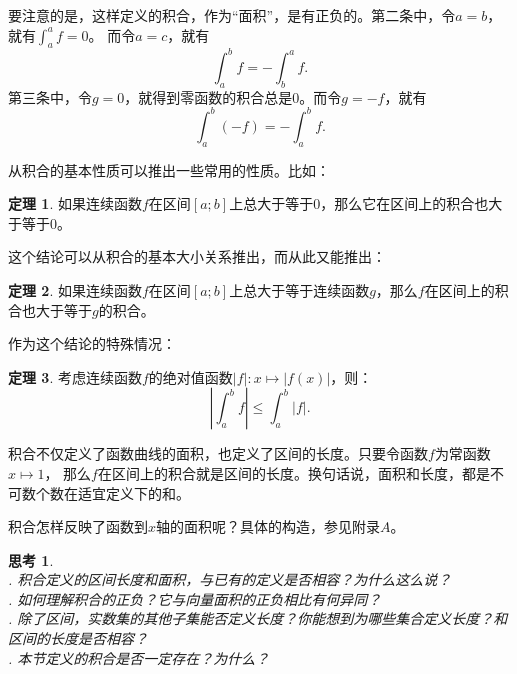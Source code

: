\documentclass[12pt,UTF8]{ctexbook}
\theoremstyle{definition}
\newtheorem{tm}{定理}[section]
\theoremstyle{plain}
\newtheorem{sk}{思考}[section]
\begin{document}
要注意的是，这样定义的积合，作为“面积”，是有正负的。第二条中，令$a=b$，就有$\int_a^a f = 0$。
而令$a = c$，就有
$$\int_a^b f = - \int_b^a f.$$
第三条中，令$g=0$，就得到零函数的积合总是$0$。而令$g = -f$，就有
$$\int_a^b (-f) = -\int_a^b f. $$

从积合的基本性质可以推出一些常用的性质。比如：

\begin{tm}
    如果连续函数$f$在区间$[a; b]$上总大于等于$0$，那么它在区间上的积合也大于等于$0$。
\end{tm}

这个结论可以从积合的基本大小关系推出，而从此又能推出：

\begin{tm}
    如果连续函数$f$在区间$[a; b]$上总大于等于连续函数$g$，那么$f$在区间上的积合也大于等于$g$的积合。
\end{tm}

作为这个结论的特殊情况：

\begin{tm}
    考虑连续函数$f$的绝对值函数$|f|: x\mapsto |f(x)|$，则：
    $$ \left| \int_a^b f \right| \leqslant \int_a^b |f|. $$

\end{tm}

积合不仅定义了函数曲线的面积，也定义了区间的长度。只要令函数$f$为常函数$x\mapsto 1$，
那么$f$在区间上的积合就是区间的长度。换句话说，面积和长度，都是不可数个数在适宜定义下的和。

积合怎样反映了函数到$x$轴的面积呢？具体的构造，参见附录$A$。

\begin{sk}
    \mbox{} \\
    . 积合定义的区间长度和面积，与已有的定义是否相容？为什么这么说？\\
    . 如何理解积合的正负？它与向量面积的正负相比有何异同？\\
    . 除了区间，实数集的其他子集能否定义长度？你能想到为哪些集合定义长度？和区间的长度是否相容？\\
    . 本节定义的积合是否一定存在？为什么？
\end{sk}
\end{document}

